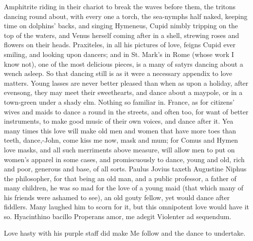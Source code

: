 Amphitrite riding in their chariot to break the waves before them, the
tritons dancing round about, with every one a torch, the sea-nymphs
half naked, keeping time on dolphins' backs, and singing Hymeneus,
Cupid nimbly tripping on the top of the waters, and Venus herself
coming after in a shell, strewing roses and flowers on their heads.
Praxiteles, in all his pictures of love, feigns Cupid ever smiling, and
looking upon dancers; and in St. Mark's in Rome (whose work I know
not), one of the most delicious pieces, is a many of satyrs
dancing about a wench asleep. So that dancing still is as it were a
necessary appendix to love matters. Young lasses are never better
pleased than when as upon a holiday, after evensong, they may meet
their sweethearts, and dance about a maypole, or in a town-green under
a shady elm. Nothing so familiar in. France, as for citizens'
wives and maids to dance a round in the streets, and often too, for
want of better instruments, to make good music of their own voices, and
dance after it. Yea many times this love will make old men and women
that have more toes than teeth, dance,-John, come kiss me now, mask and
mum; for Comus and Hymen love masks, and all such merriments above
measure, will allow men to put on women's apparel in some cases, and
promiscuously to dance, young and old, rich and poor, generous and
base, of all sorts. Paulus Jovius taxeth Augustine Niphus the
philosopher, for that being an old man, and a public professor, a
father of many children, he was so mad for the love of a young maid
(that which many of his friends were ashamed to see), an old gouty
fellow, yet would dance after fiddlers. Many laughed him to scorn for
it, but this omnipotent love would have it so.
Hyacinthino bacillo
Properans amor, me adegit
Violenter ad sequendum.

Love hasty with his purple staff did make
Me follow and the dance to undertake.

